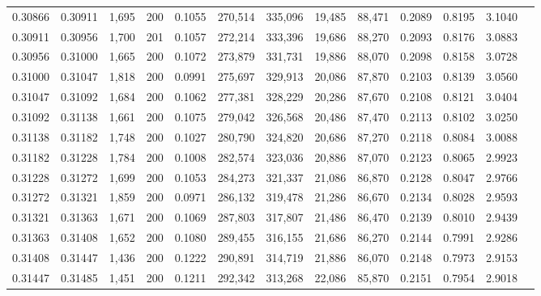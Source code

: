 \begin{tabular}{rrrrrrrrrrrrr}
0.30866 & 0.30911 & 1,695 & 200 &                                     0.1055 & 270,514 & 335,096 &  19,485 &  88,471 & 0.2089 & 0.8195 & 3.1040 \\
0.30911 & 0.30956 & 1,700 & 201 &                                     0.1057 & 272,214 & 333,396 &  19,686 &  88,270 & 0.2093 & 0.8176 & 3.0883 \\
0.30956 & 0.31000 & 1,665 & 200 &                                     0.1072 & 273,879 & 331,731 &  19,886 &  88,070 & 0.2098 & 0.8158 & 3.0728 \\
0.31000 & 0.31047 & 1,818 & 200 &                                     0.0991 & 275,697 & 329,913 &  20,086 &  87,870 & 0.2103 & 0.8139 & 3.0560 \\
0.31047 & 0.31092 & 1,684 & 200 &                                     0.1062 & 277,381 & 328,229 &  20,286 &  87,670 & 0.2108 & 0.8121 & 3.0404 \\
0.31092 & 0.31138 & 1,661 & 200 &                                     0.1075 & 279,042 & 326,568 &  20,486 &  87,470 & 0.2113 & 0.8102 & 3.0250 \\
0.31138 & 0.31182 & 1,748 & 200 &                                     0.1027 & 280,790 & 324,820 &  20,686 &  87,270 & 0.2118 & 0.8084 & 3.0088 \\
0.31182 & 0.31228 & 1,784 & 200 &                                     0.1008 & 282,574 & 323,036 &  20,886 &  87,070 & 0.2123 & 0.8065 & 2.9923 \\
0.31228 & 0.31272 & 1,699 & 200 &                                     0.1053 & 284,273 & 321,337 &  21,086 &  86,870 & 0.2128 & 0.8047 & 2.9766 \\
0.31272 & 0.31321 & 1,859 & 200 &                                     0.0971 & 286,132 & 319,478 &  21,286 &  86,670 & 0.2134 & 0.8028 & 2.9593 \\
0.31321 & 0.31363 & 1,671 & 200 &                                     0.1069 & 287,803 & 317,807 &  21,486 &  86,470 & 0.2139 & 0.8010 & 2.9439 \\
0.31363 & 0.31408 & 1,652 & 200 &                                     0.1080 & 289,455 & 316,155 &  21,686 &  86,270 & 0.2144 & 0.7991 & 2.9286 \\
0.31408 & 0.31447 & 1,436 & 200 &                                     0.1222 & 290,891 & 314,719 &  21,886 &  86,070 & 0.2148 & 0.7973 & 2.9153 \\
0.31447 & 0.31485 & 1,451 & 200 &                                     0.1211 & 292,342 & 313,268 &  22,086 &  85,870 & 0.2151 & 0.7954 & 2.9018 \\

\end{tabular}
